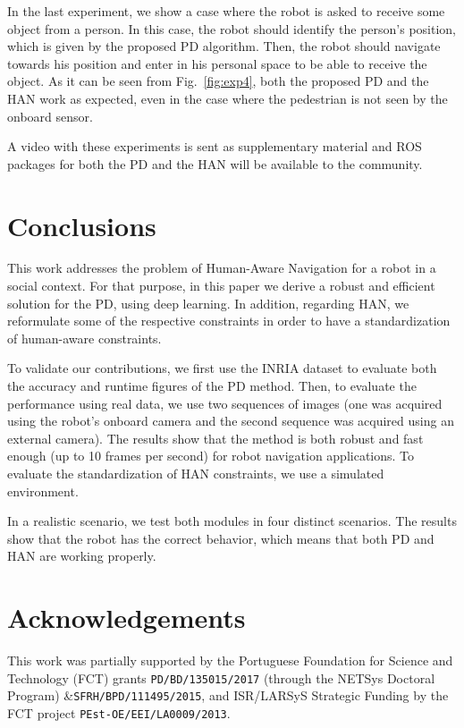 \documentclass[5p,time]{elsarticle}
\begin{document}
In the last experiment, we show a case where the robot is asked to receive some object from a person. In this case, the robot should identify the person's position, which is given by the proposed PD algorithm. Then, the robot should navigate towards his position and enter in his personal space to be able to receive the object. As it can be seen from Fig.~\ref{fig:exp4}, both the proposed PD and the HAN work as expected, even in the case where the pedestrian is not seen by the onboard sensor.

A video with these experiments is sent as supplementary material and ROS packages for both the PD and the HAN will be available to the community.


\section{Conclusions}
\label{sec:conclusions}

This work addresses the problem of Human-Aware Navigation for a robot in a social context. For that purpose, in this paper we derive a robust and efficient solution for the PD, using deep learning. In addition, regarding HAN, we reformulate some of the respective constraints in order to have a standardization of human-aware constraints.

To validate our contributions, we first use the INRIA dataset to evaluate both the accuracy and runtime figures of the PD method. Then, to evaluate the performance using real data, we use two sequences of images (one was acquired using the robot's onboard camera and the second sequence was acquired using an external camera). The results show that the method is both robust and fast enough (up to 10 frames per second) for robot navigation applications. To evaluate the standardization of HAN constraints, we use a simulated environment.

In a realistic scenario, we test both modules in four distinct scenarios. The results show that the robot has the correct behavior, which means that both PD and HAN are working properly.

\section*{Acknowledgements}
This work was partially supported by the Portuguese Foundation for Science and Technology (FCT) grants {\tt PD/BD/135015/2017} (through the NETSys Doctoral Program) \&{\tt SFRH/BPD/111495/2015}, and ISR/LARSyS Strategic Funding by the FCT project  {\tt PEst-OE/EEI/LA0009/2013}.
\end{document}
